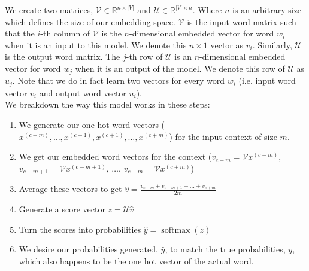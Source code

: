 \documentclass{tufte-handout}
\begin{document}
We create two matrices, $\mathcal{V} \in \mathbb{R}^{n\times|V|}$ and $\mathcal{U} \in \mathbb{R}^{|V|\times n}$. Where $n$ is an arbitrary size which defines the size of our embedding space. $\mathcal{V}$ is the input word matrix such that the $i$-th column of $\mathcal{V}$ is the $n$-dimensional embedded vector for word $w_{i}$ when it is an input to this model. We denote this $n\times1$ vector as $v_{i}$. Similarly, $\mathcal{U}$ is the output word matrix. The $j$-th row of $\mathcal{U}$ is an $n$-dimensional embedded vector for word $w_{j}$ when it is an output of the model. We denote this row of $\mathcal{U}$ as $u_{j}$. Note that we do in fact learn two vectors for every word $w_{i}$ (i.e. input word vector $v_{i}$ and output word vector $u_{i}$).
$$ $$
We breakdown the way this model works in these steps:
\begin{enumerate}
\item We generate our one hot word vectors ($x^{(c-m)}, \hdots, x^{(c-1)}, x^{(c+1)},\hdots, x^{(c+m)}$) for the input context of size $m$.
\item We get our embedded word vectors for the context ($v_{c-m}=\mathcal{V}x^{(c-m)}$, $v_{c-m+1}=\mathcal{V}x^{(c-m+1)}$, $\hdots$, $v_{c+m}=\mathcal{V}x^{(c+m)}$) 
\item Average these vectors to get $\hat{v} = \frac{v_{c-m}+v_{c-m+1}+... + v_{c+m}}{2m}$
\item Generate a score vector $z=\mathcal{U}\hat{v}$
\item Turn the scores into probabilities $\hat{y}=\operatorname{softmax}(z)$
\item We desire our probabilities generated, $\hat{y}$, to match the true probabilities, $y$, which also happens to be the one hot vector of the actual word.
\end{enumerate}
\end{document}
